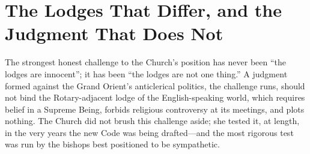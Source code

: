 \section{The Lodges That Differ, and the Judgment That Does Not}

The strongest honest challenge to the Church's position has never been ``the lodges are innocent''; it has been ``the lodges are not one thing.'' A judgment formed against the Grand Orient's anticlerical politics, the challenge runs, should not bind the Rotary-adjacent lodge of the English-speaking world, which requires belief in a Supreme Being, forbids religious controversy at its meetings, and plots nothing. The Church did not brush this challenge aside; she tested it, at length, in the very years the new Code was being drafted---and the most rigorous test was run by the bishops best positioned to be sympathetic.

